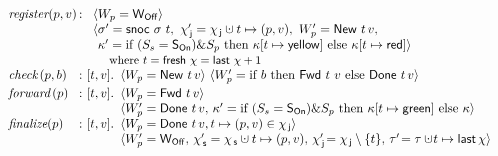 
{
\begin{figure}[t]
%
\centering
\small
\[
\begin{array}{l@{\, :\ } l}
 \aux{register}(p,v) & 
  \begin{array}[t]{l}
   \langle \wpp = \wInit\rangle\\ 
   \langle\ordlistP = \mathsf{snoc}\ {\ordlist}\ t,\
     \histJP = \histJ \hunion t \hpts (p,v),\ \wppP = \wWrite\ t\, v,\\
   \phantom{\langle} \C' = \textrm{if}\ (\sss = \sOn) \& \spp\
                    \textrm{then}\ \C[t \mapsto \mathsf{yellow}]\
                    \textrm{else}\ \C[t \mapsto \mathsf{red}]\rangle \\
   \ \mbox{\small{where $t = \mathsf{fresh}\ \hist = \mathsf{last}\ {\hist}+1$}}
  \end{array} \\[2.5pt]
  \aux{check}\,(p,b) & [t, v]\ldot
  \!\begin{array}[t]{l}
  \langle\wpp = \wWrite\ t\, v\rangle\ 
  \langle\wppP = \textrm{if}\ b\
  \textrm{then}\ \wDirty\ t\, \,v\ \textrm{else}\ \wClean\ t\, v\rangle
 \end{array}\\[2.5pt]
  \aux{forward}\,(p) & [t, v]\ldot
  \!\begin{array}[t]{l}
   \langle\wpp = \wDirty\ t\,v \rangle\\ 
   \langle\wppP = \wClean\ t\,v,\, %
   \C' = \textrm{if}\ (\sss=\sOn) \& \spp\ \textrm{then}\ \C[t \mapsto \mathsf{green}]\ \textrm{else}\ \C\rangle
  \end{array}\\[2.5 pt]
  \aux{finalize}(p) & [t, v]\ldot
  \!\begin{array}[t]{l}
  \langle\wpp = \wClean\ t\, v, %
  t \hpts (p, v) \in \histJ \rangle\\
  \langle\wppP = \wInit,\, \histSP = \histS \hunion t \hpts (p,v),\, %
  \histJP\! = \histJ\setminus\{t\},\,
  \E'\! = \E \hunion\! t \hpts \mathsf{last}\, \hist \rangle
 \end{array}
\end{array}
\]
\hrulefill

\end{figure}}
